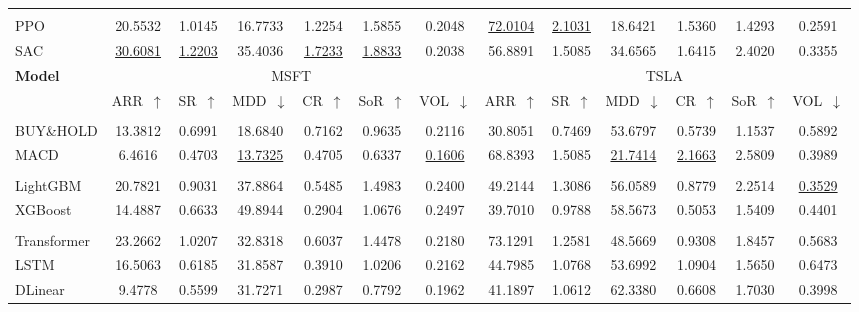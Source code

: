 \begin{table}[htb]
{\begin{tabular}{lcccccccccccc}
\rowcolor{gray!15}
\multicolumn{13}{c}{\textit{\textbf{RL-based}}} \\
PPO & 20.5532 & 1.0145 & 16.7733 & 1.2254 & 1.5855 & 0.2048 & \underline{72.0104} & \underline{2.1031} & 18.6421 & 1.5360 & 1.4293 & 0.2591 \\
SAC & \underline{30.6081} & \underline{1.2203} & 35.4036 & \underline{1.7233} & \underline{1.8833} & 0.2038 & 56.8891 & 1.5085 & 34.6565 & 1.6415 & 2.4020 & 0.3355 \\

\bottomrule
\toprule

\multirow{2}{*}{\parbox{1.2cm}{\centering\textbf{Model}}}
    & \multicolumn{6}{c}{MSFT}
    & \multicolumn{6}{c}{TSLA} \\

\cmidrule(lr){2-7} \cmidrule(lr){8-13}
& ARR~$\uparrow$ & SR~$\uparrow$ & MDD~$\downarrow$ & CR~$\uparrow$ & SoR~$\uparrow$ & VOL~$\downarrow$
& ARR~$\uparrow$ & SR~$\uparrow$ & MDD~$\downarrow$ & CR~$\uparrow$ & SoR~$\uparrow$ & VOL~$\downarrow$ \\
\midrule

\rowcolor{gray!15}
\multicolumn{13}{c}{\textit{\textbf{Rule-based}}} \\
BUY\&HOLD & 13.3812 & 0.6991 & 18.6840 & 0.7162 & 0.9635 & 0.2116 & 30.8051 & 0.7469 & 53.6797 & 0.5739 & 1.1537 & 0.5892 \\
MACD & 6.4616 & 0.4703 & \underline{13.7325} & 0.4705 & 0.6337 & \underline{0.1606} & 68.8393 & 1.5085 & \underline{21.7414} & \underline{2.1663} & 2.5809 & 0.3989 \\

\rowcolor{gray!15}
\multicolumn{13}{c}{\textit{\textbf{ML-based}}} \\
LightGBM  & 20.7821 & 0.9031 & 37.8864 & 0.5485 & 1.4983 & 0.2400 & 49.2144 & 1.3086 & 56.0589 & 0.8779 & 2.2514 & \underline{0.3529} \\
XGBoost  & 14.4887 & 0.6633 & 49.8944 & 0.2904 & 1.0676 & 0.2497 &  39.7010 & 0.9788 & 58.5673 & 0.5053 & 1.5409 & 0.4401 \\

\rowcolor{gray!15}
\multicolumn{13}{c}{\textit{\textbf{DL-based}}} \\
Transformer   & 23.2662 & 1.0207 & 32.8318 & 0.6037 & 1.4478 & 0.2180 & 73.1291 & 1.2581 & 48.5669 & 0.9308 & 1.8457 & 0.5683 \\
LSTM   & 16.5063 & 0.6185 & 31.8587 & 0.3910 & 1.0206 & 0.2162 & 44.7985 & 1.0768 & 53.6992 & 1.0904 & 1.5650 & 0.6473 \\
DLinear   & 9.4778 & 0.5599 & 31.7271 & 0.2987 & 0.7792 & 0.1962 & 41.1897 & 1.0612 & 62.3380 & 0.6608 & 1.7030 & 0.3998 \\


\end{tabular}}
\end{table}
